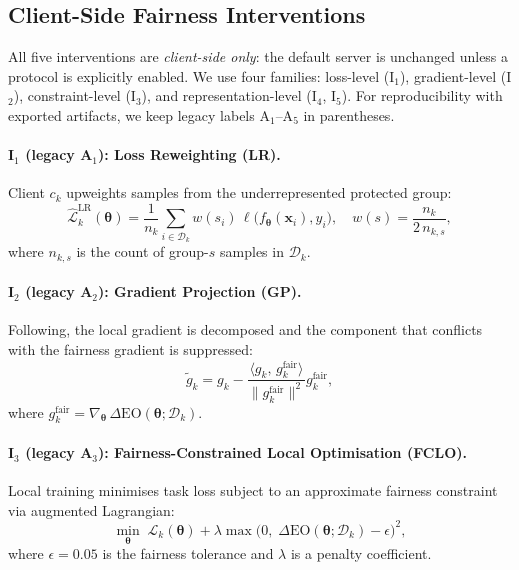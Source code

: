 ﻿\documentclass{article}
\newcommand{\calD}{\mathcal{D}}
\newcommand{\calL}{\mathcal{L}}
\newcommand{\params}{\boldsymbol{\theta}}%
\newcommand{\grad}{\nabla}
\newcommand{\DEOpp}{\Delta\mathrm{EO}}   %
\begin{document}
\subsection{Client-Side Fairness Interventions}
\label{sec:attacks}

All five interventions are \emph{client-side only}: the default server
is unchanged unless a protocol is explicitly enabled.
We use four families:
loss-level (I$_1$),
gradient-level (I$_2$),
constraint-level (I$_3$), and
representation-level (I$_4$, I$_5$).
For reproducibility with exported artifacts, we keep legacy labels
A$_1$--A$_5$ in parentheses.

\paragraph{I$_1$ (legacy A$_1$): Loss Reweighting (LR).}
Client $c_k$ upweights samples from the underrepresented protected
group:
\begin{equation}
  \hat{\calL}_k^{\text{LR}}(\params)
  = \frac{1}{n_k}\sum_{i \in \calD_k}
    w(s_i)\,\ell\bigl(f_{\params}(\mathbf{x}_i), y_i\bigr),
  \quad
  w(s) = \frac{n_k}{2\,n_{k,s}},
  \label{eq:a1}
\end{equation}
where $n_{k,s}$ is the count of group-$s$ samples in $\calD_k$.

\paragraph{I$_2$ (legacy A$_2$): Gradient Projection (GP).}
Following, the local gradient is decomposed and
the component that conflicts with the fairness gradient is suppressed:
\begin{equation}
  \tilde{g}_k = g_k - \frac{\langle g_k,\, g_k^{\text{fair}}\rangle}
    {\|g_k^{\text{fair}}\|^2} g_k^{\text{fair}},
  \label{eq:a2}
\end{equation}
where $g_k^{\text{fair}} = \grad_{\params}\,\DEOpp(\params; \calD_k)$.

\paragraph{I$_3$ (legacy A$_3$): Fairness-Constrained Local Optimisation (FCLO).}
Local training minimises task loss subject to an approximate
fairness constraint via augmented Lagrangian:
\begin{equation}
  \min_{\params}\;\calL_k(\params)
  + \lambda \max\!\bigl(0,\; \DEOpp(\params;\calD_k) - \epsilon\bigr)^2,
  \label{eq:a3}
\end{equation}
where $\epsilon{=}0.05$ is the fairness tolerance and
$\lambda$ is a penalty coefficient.
\end{document}
